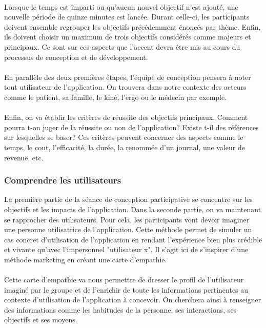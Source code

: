 \paragraph{} Lorsque le temps est imparti ou qu'aucun nouvel objectif n'est ajouté, une nouvelle période de quinze minutes est lancée. Durant celle-ci, les participants doivent ensemble regrouper les objectifs précédemment énoncés par thème. Enfin, ils doivent choisir un maximum de trois objectifs considérés comme majeurs et principaux. Ce sont sur ces aspects que l'accent devra être mis au cours du processus de conception et de développement.

\paragraph{}En parallèle des deux premières étapes, l'équipe de conception pensera à noter tout utilisateur de l'application. On trouvera dans notre contexte des acteurs comme le patient, sa famille, le kiné, l'ergo ou le médecin par exemple.

\paragraph{}Enfin, on va établir les critères de réussite des objectifs principaux. Comment pourra t-on juger de la réussite ou non de l'application? Existe t-il des références sur lesquelles se baser? Ces critères peuvent concerner des aspects comme le temps, le cout, l'efficacité, la durée, la renommée d'un journal, une valeur de revenue, etc.

	
	\subsubsection*{Comprendre les utilisateurs}
La première partie de la séance de conception participative se concentre sur les objectifs et les impacts de l'application. Dans la seconde partie, on va maintenant se rapprocher 	des utilisateurs. Pour cela, les participants vont devoir imaginer une personne utilisatrice de l'application. Cette méthode permet de simuler un cas concret d'utilisation de l'application en rendant l'expérience bien plus crédible et vivante qu'avec l'impersonnel "utilisateur x". Il s'agit ici de s'inspirer d'une méthode marketing en créant une carte d'empathie.

\paragraph{} Cette carte d'empathie va nous permettre de dresser le profil de l'utilisateur imaginé par le groupe et de l'enrichir de toute les informations pertinentes au contexte d'utilisation de l'application à concevoir. On cherchera ainsi à renseigner des informations comme les habitudes de la personne, ses interactions, ses objectifs et ses moyens.

